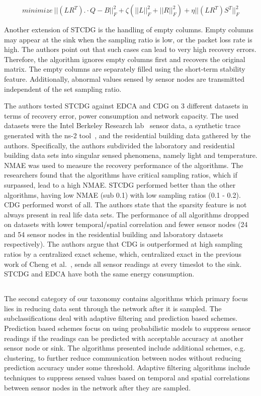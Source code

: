 $$
minimize \ ||(LR^T). \cdot Q-B||^2_F + \zeta(||L||^2_F + ||R||^2_F) + \eta ||(LR^T)S^T||^2_F
$$

Another extension of \ac{STCDG} is the handling of empty columns. Empty
columns may appear at the sink when the sampling ratio is low, or the packet
loss rate is high. The authors point out that such cases can lead to very high
recovery errors. Therefore, the algorithm ignores empty columns first and
recovers the original matrix. The empty columns are separately filled using the
short-term stability feature. Additionally, abnormal values sensed by sensor
nodes are transmitted independent of the set sampling ratio.

The authors tested \ac{STCDG} against \ac{EDCA} and \ac{CDG} on 3 different
datasets in terms of recovery error, power consumption and network capacity.
The used datasets were the Intel Berkeley Research lab~\cite{labdata} sensor
data, a synthetic trace generated with the ns-2 tool~\cite{bajaj1999improving},
and the residential building data gathered by the authors. Specifically, the
authors subdivided the laboratory and residential building data sets into
singular sensed phenomena, namely light and temperature. \ac{NMAE} was used to
measure the recovery performance of the algorithms. The researchers found that
the algorithms have critical sampling ratios, which if surpassed, lead to a
high \ac{NMAE}. \ac{STCDG} performed better than the other algorithms, having
low \ac{NMAE} (sub 0.1) with low sampling ratios (0.1 - 0.2). \ac{CDG} performed
worst of all. The authors state that the sparsity feature is not always present
in real life data sets. The performance of all algorithms dropped on datasets
with lower temporal/spatial correlation and fewer sensor nodes (24 and 54
sensor nodes in the residential building and laboratory datasets respectively).
The authors argue that \ac{CDG} is outperformed at high sampling ratios by a
centralized exact scheme, which, centralized exact in the previous work of
Cheng et al.~\cite{cheng2013stcdg}, sends all sensor readings at every timeslot
to the sink. \ac{STCDG} and \ac{EDCA} have both the same energy consumption.


\subsection{\catII} %
\label{sec:catII}

The second category of our taxonomy contains algorithms which primary focus
lies in reducing data sent through the network after it is sampled. The
subclassifications deal with adaptive filtering and prediction based schemes.
Prediction based schemes focus on using probabilistic models to suppress sensor
readings if the readings can be predicted with acceptable accuracy at another
sensor node or sink. The algorithms presented include additional schemes, e.g.
clustering, to further reduce communication between nodes without reducing
prediction accuracy under some threshold. Adaptive filtering algorithms include
techniques to suppress sensed values based on temporal and spatial correlations
between sensor nodes in the network after they are sampled.

